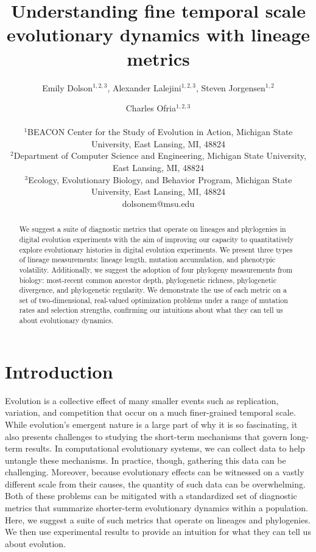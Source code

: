 \documentclass[letterpaper]{article}
\title{Understanding fine temporal scale evolutionary dynamics with lineage metrics}
\author{Emily Dolson$^{1,2,3}$, Alexander Lalejini$^{1,2, 3}$, Steven Jorgensen$^{1,2}$ \and Charles Ofria$^{1,2, 3}$ \\
\mbox{}\\
$^1$BEACON Center for the Study of Evolution in Action, Michigan State University, East Lansing, MI, 48824 \\
$^2$Department of Computer Science and Engineering, Michigan State University, East Lansing, MI, 48824 \\
$^3$Ecology, Evolutionary Biology, and Behavior Program, Michigan State University, East Lansing, MI, 48824 \\
dolsonem@msu.edu} %
\begin{document}
\maketitle

\begin{abstract}
We suggest a suite of diagnostic metrics that operate on lineages and phylogenies in digital evolution experiments with the aim of improving our capacity to quantitatively explore evolutionary histories in digital evolution experiments.
We present three types of lineage measurements: lineage length, mutation accumulation, and phenotypic volatility. 
Additionally, we suggest the adoption of four phylogeny measurements from biology: most-recent common ancestor depth, phylogenetic richness, phylogenetic divergence, and phylogenetic regularity. 
We demonstrate the use of each metric on a set of two-dimensional, real-valued optimization problems under a range of mutation rates and selection strengths, confirming our intuitions about what they can tell us about evolutionary dynamics. 

\end{abstract}

\section{Introduction}

Evolution is a collective effect of many smaller events such as replication, variation, and competition that occur on a much finer-grained temporal scale. While evolution's emergent nature is a large part of why it is so fascinating, it also presents challenges to studying the short-term mechanisms that govern long-term results. In computational evolutionary systems, we can collect data to help untangle these mechanisms. In practice, though, gathering this data can be challenging. 
Moreover, because evolutionary effects can be witnessed on a vastly different scale from their causes, the quantity of such data can be overwhelming.
Both of these problems can be mitigated with a standardized set of diagnostic metrics that summarize shorter-term evolutionary dynamics within a population. Here, we suggest a suite of such metrics that operate on lineages and phylogenies. We then use experimental results to provide an intuition for what they can tell us about evolution.
\end{document}
